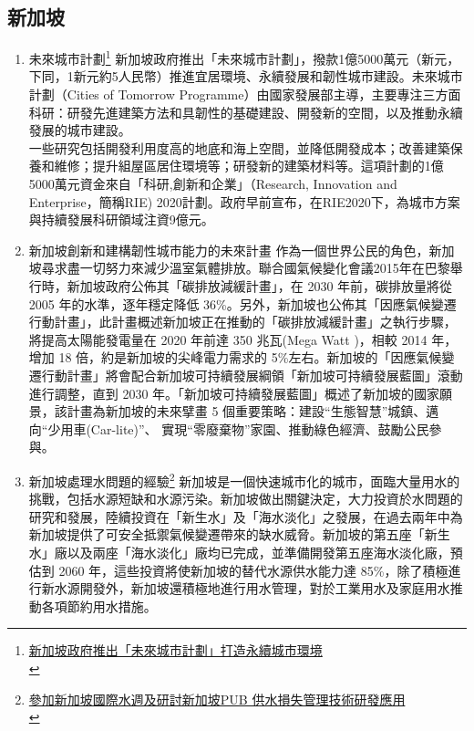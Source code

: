 \documentclass[a4paper,12pt]{article}
\begin{document}
\subsection{新加坡}
\label{sec:org64b24d5}
\begin{enumerate}
\item 未來城市計劃\footnote{\href{https://kknews.cc/zh-tw/news/j6njzzp.html}{新加坡政府推出「未來城市計劃」打造永續城市環境}\\}
\label{sec:org49f7171}
新加坡政府推出「未來城市計劃」，撥款1億5000萬元（新元，下同，1新元約5人民幣）推進宜居環境、永續發展和韌性城市建設。未來城市計劃（Cities of Tomorrow Programme）由國家發展部主導，主要專注三方面科研：研發先進建築方法和具韌性的基礎建設、開發新的空間，以及推動永續發展的城市建設。\\

一些研究包括開發利用度高的地底和海上空間，並降低開發成本；改善建築保養和維修；提升組屋區居住環境等；研發新的建築材料等。這項計劃的1億5000萬元資金來自「科研,創新和企業」（Research, Innovation and Enterprise，簡稱RIE) 2020計劃。政府早前宣布，在RIE2020下，為城市方案與持續發展科研領域注資9億元。\\

\item 新加坡創新和建構韌性城市能力的未來計畫
\label{sec:orgd06b7b0}
作為一個世界公民的角色，新加坡尋求盡一切努力來減少溫室氣體排放。聯合國氣候變化會議2015年在巴黎舉行時，新加坡政府公佈其「碳排放減緩計畫」，在 2030 年前，碳排放量將從 2005 年的水準，逐年穩定降低 36\%。另外，新加坡也公佈其「因應氣候變遷行動計畫」，此計畫概述新加坡正在推動的「碳排放減緩計畫」之執行步驟，將提高太陽能發電量在 2020 年前達 350 兆瓦(Mega Watt )，相較 2014 年，增加 18 倍，約是新加坡的尖峰電力需求的 5\%左右。新加坡的「因應氣候變遷行動計畫」將會配合新加坡可持續發展綱領「新加坡可持續發展藍圖」滾動進行調整，直到 2030 年。「新加坡可持續發展藍圖」概述了新加坡的國家願景，該計畫為新加坡的未來擘畫 5 個重要策略：建設“生態智慧”城鎮、邁向“少用車(Car-lite)”、 實現“零廢棄物”家園、推動綠色經濟、鼓勵公民參與。\\

\item 新加坡處理水問題的經驗\footnote{\href{https://report.nat.gov.tw/ReportFront/PageSystem/reportFileDownload/C10502349/001}{參加新加坡國際水週及研討新加坡PUB 供水損失管理技術研發應用}\\}
\label{sec:org94c5674}
新加坡是一個快速城市化的城市，面臨大量用水的挑戰，包括水源短缺和水源污染。新加坡做出關鍵決定，大力投資於水問題的研究和發展，陸續投資在「新生水」及「海水淡化」之發展，在過去兩年中為新加坡提供了可安全抵禦氣候變遷帶來的缺水威脅。新加坡的第五座「新生水」廠以及兩座「海水淡化」廠均已完成，並準備開發第五座海水淡化廠，預估到 2060 年，這些投資將使新加坡的替代水源供水能力達 85\%，除了積極進行新水源開發外，新加坡還積極地進行用水管理，對於工業用水及家庭用水推動各項節約用水措施。\\


\end{enumerate}
\end{document}
